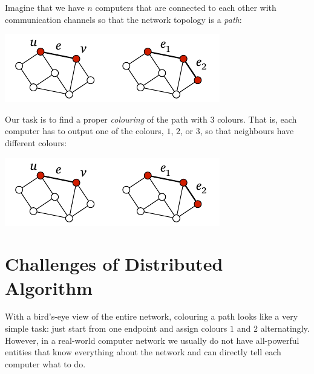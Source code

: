 
Imagine that we have $n$ computers that are connected to each other with communication channels so that the network topology is a \emph{path}:
\begin{center}
    \includegraphics[page=\PIntroTopo]{figs.pdf}
\end{center}
Our task is to find a proper \emph{colouring} of the path with $3$ colours. That is, each computer has to output one of the colours, $1$, $2$, or $3$, so that neighbours have different colours:
\begin{center}
    \includegraphics[page=\PIntroCol]{figs.pdf}
\end{center}

\section{Challenges of Distributed Algorithm}

With a bird's-eye view of the entire network, colouring a path looks like a very simple task: just start from one endpoint and assign colours $1$ and $2$ alternatingly. However, in a real-world computer network we usually do not have all-powerful entities that know everything about the network and can directly tell each computer what to do.


